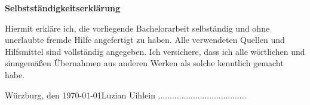 \fancyhf{}
\renewcommand{\headrule}{}

\begin{center}
    \LARGE \textbf{Selbstständigkeitserklärung}\normalsize
\end{center}

\bigskip

Hiermit erkläre ich, die vorliegende Bachelorarbeit selbständig und ohne unerlaubte fremde Hilfe angefertigt zu haben. Alle verwendeten Quellen und Hilfsmittel sind vollständig angegeben. Ich versichere, dass ich alle wörtlichen und sinngemäßen Übernahmen aus anderen Werken als solche kenntlich gemacht habe.

\setlength{\bigskipamount}{5em}
\bigskip

Würzburg, den \today \hfill Luzian Uihlein ......................................
\vspace{2cm}
